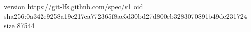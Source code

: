version https://git-lfs.github.com/spec/v1
oid sha256:0a342e9258a19c217ca772365f8ac5d30bd27d800eb3283070891b49de231724
size 87544
